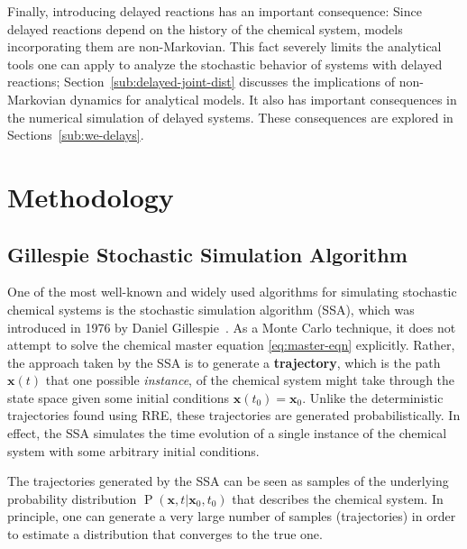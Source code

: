 \documentclass[english,letterpaper,12pt]{report}
\newcommand{\defkeywd}[1]{\textbf{#1}}
\renewcommand{\vec}[1]{\ensuremath{\mathbf{#1}}}
\DeclareMathOperator{\Prob}{P}
\begin{document}
\begin{doublespacing}
Finally, introducing delayed reactions has an important consequence: Since delayed reactions depend on the history of the chemical system, models incorporating them are non-Markovian. This fact severely limits the analytical tools one can apply to analyze the stochastic behavior of systems with delayed reactions; Section~\ref{sub:delayed-joint-dist} discusses the implications of non-Markovian dynamics for analytical models. It also has important consequences in the numerical simulation of delayed systems. These consequences are explored in Sections~\ref{sub:we-delays}.



\chapter{Methodology} %
\label{sec:methodology}

\section{Gillespie Stochastic Simulation Algorithm} %
\label{sub:gillespie-ssa}

One of the most well-known and widely used  algorithms for simulating stochastic chemical systems is the stochastic simulation algorithm (SSA), which was introduced in 1976 by Daniel Gillespie~\cite{gillespie-1976}. As a Monte Carlo technique, it does not attempt to solve the chemical master equation \eqref{eq:master-eqn} explicitly. Rather, the approach taken by the SSA is to generate a \defkeywd{trajectory}, which is the path $\vec{x}(t)$ that one possible \emph{instance}, of the chemical system might take through the state space given some initial conditions $\vec{x}(t_0) = \vec{x}_0$. Unlike the deterministic trajectories found using RRE, these trajectories are generated probabilistically. In effect, the SSA simulates the time evolution of a single instance of the chemical system with some arbitrary initial conditions.

The trajectories generated by the SSA can be seen as samples of the underlying probability distribution $\Prob(\vec{x}, t | \vec{x}_0, t_0)$ that describes the chemical system. In principle, one can generate a very large number of samples (trajectories) in order to estimate a distribution that converges to the true one.



\end{doublespacing}
\end{document}
